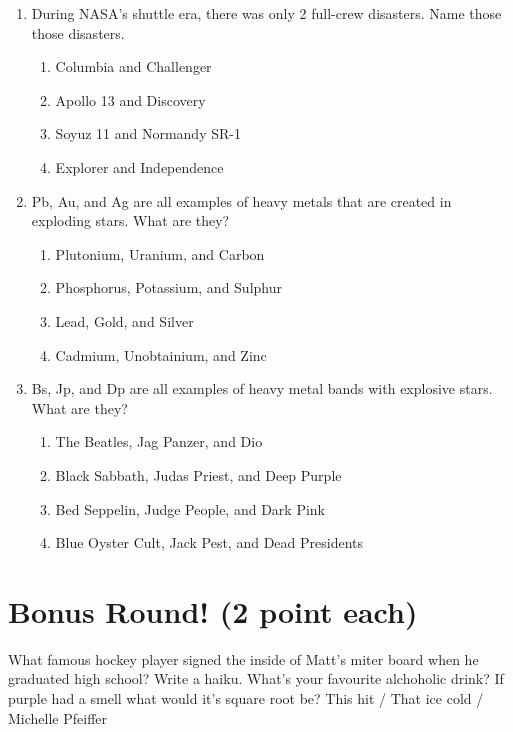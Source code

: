 \documentclass[11pt]{exam}
\begin{document}
\begin{questions}
\begin{enumerate}
\item During NASA's shuttle era, there was only 2 full-crew disasters. Name those those disasters.

\begin{enumerate}
\item Columbia and Challenger
\item Apollo 13 and Discovery
\item Soyuz 11 and Normandy SR-1
\item Explorer and Independence
\end{enumerate}

\item Pb, Au, and Ag are all examples of heavy metals that are created in exploding stars. What are they?

\begin{enumerate}
\item Plutonium, Uranium, and Carbon
\item Phosphorus, Potassium, and Sulphur
\item Lead, Gold, and Silver
\item Cadmium, Unobtainium, and Zinc
\end{enumerate}

\item Bs, Jp, and Dp are all examples of heavy metal bands with explosive stars. What are they?

\begin{enumerate}
\item The Beatles, Jag Panzer, and Dio
\item Black Sabbath, Judas Priest, and Deep Purple
\item Bed Seppelin, Judge People, and Dark Pink
\item Blue Oyster Cult, Jack Pest, and Dead Presidents
\end{enumerate}


\end{enumerate}

\section{Bonus Round! (2 point each)}
\setcounter{question}{0}
\question What famous hockey player signed the inside of Matt's miter board when he graduated high school?
\vspace{2cm}
\question Write a haiku.
\vspace{5cm}
\question What's your favourite alchoholic drink?
\vspace{2cm}
\question If purple had a smell what would it's square root be?
\vspace{2cm}
\question This hit / That ice cold / Michelle Pfeiffer
\vspace{2cm}








\end{questions}
\end{document}
